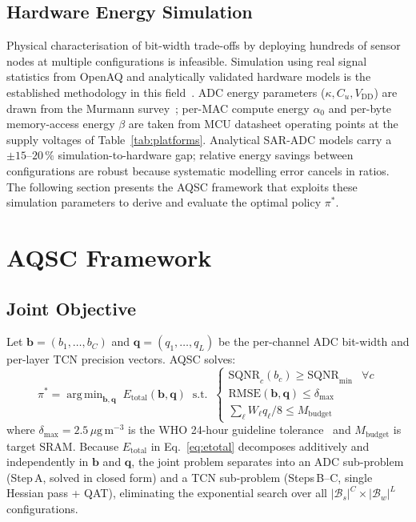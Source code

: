 \documentclass[12pt,a4paper]{article}
\DeclareMathOperator*{\argmin}{arg\,min}
\newcommand{\vect}[1]{\boldsymbol{#1}}
\begin{document}
\subsection{Hardware Energy Simulation}
\label{sec:sim_hw}

Physical characterisation of bit-width trade-offs by deploying
hundreds of sensor nodes at multiple configurations is infeasible.
Simulation using real signal statistics from OpenAQ and analytically
validated hardware models is the established methodology in this
field~\cite{ma2023aqedge,chen2023tinyml,banbury2021mlperf}.
ADC energy parameters ($\kappa, C_u, V_\mathrm{DD}$) are drawn from
the Murmann survey~\cite{murmann2023adc}; per-MAC compute energy
$\alpha_0$ and per-byte memory-access energy $\beta$ are taken from
MCU datasheet operating points at the supply voltages of
Table~\ref{tab:platforms}.
Analytical SAR-ADC models carry a $\pm15$--$20\,\%$ simulation-to-hardware
gap; relative energy savings between configurations are robust because
systematic modelling error cancels in ratios.
The following section presents the AQSC framework that exploits these
simulation parameters to derive and evaluate the optimal policy $\pi^*$.

\section{AQSC Framework}
\label{sec:method}


\subsection{Joint Objective}
\label{sec:objective}

Let $\vect{b}=(b_1,\ldots,b_C)$ and $\vect{q}=(q_1,\ldots,q_L)$
be the per-channel ADC bit-width and per-layer TCN precision vectors.
AQSC solves:
\begin{equation}
\boxed{
  \pi^* = \argmin_{\vect{b},\vect{q}}\;
    E_\mathrm{total}(\vect{b},\vect{q})
  \;\;\text{s.t.}\;\;
  \begin{cases}
    \mathrm{SQNR}_c(b_c) \geq \mathrm{SQNR}_\mathrm{min} & \forall c \\[2pt]
    \mathrm{RMSE}(\vect{b},\vect{q}) \leq \delta_\mathrm{max} \\[2pt]
    \textstyle\sum_\ell W_\ell q_\ell/8 \leq M_\mathrm{budget}
  \end{cases}
}
\label{eq:obj}
\end{equation}
where $\delta_\mathrm{max}=2.5\,\mu\mathrm{g\,m^{-3}}$ is the WHO
 24-hour guideline tolerance~\cite{who2021} and
$M_\mathrm{budget}$ is target SRAM.
Because $E_\mathrm{total}$ in Eq.~\eqref{eq:etotal} decomposes
additively and independently in $\vect{b}$ and $\vect{q}$, the joint
problem separates into an ADC sub-problem (Step\,A, solved in closed
form) and a TCN sub-problem (Steps\,B--C, single Hessian pass + QAT),
eliminating the exponential search over all
$|\mathcal{B}_s|^C\!\times|\mathcal{B}_w|^L$ configurations.
\end{document}
